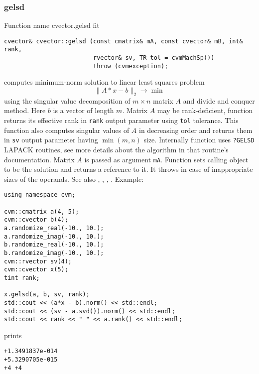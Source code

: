 \subsubsection{gelsd}
Function%
\pdfdest name {cvector.gelsd} fit
\begin{verbatim}
cvector& cvector::gelsd (const cmatrix& mA, const cvector& mB, int& rank,
                         rvector& sv, TR tol = cvmMachSp())
                         throw (cvmexception);
\end{verbatim}
computes  minimum-norm solution to  linear
least squares problem 
\begin{equation*}
\|A*x-b\|_2\to\min
\end{equation*}
using the singular value decomposition of $m\times n$ matrix $A$
and  divide and conquer method.
Here $b$ is a vector of length $m$.
Matrix $A$ may be rank-deficient, function returns its effective rank in \verb"rank"
output parameter using \verb"tol" tolerance.
This function also computes
singular values of $A$ in decreasing order and returns them in \verb"sv" output parameter
having $\min(m,n)$ size.
Internally  function uses \verb"?GELSD" LAPACK routines, see more details
about the algorithm in that routine's documentation.
Matrix $A$ is passed as  argument \verb"mA".
Function sets calling object to be the solution and returns a reference to it.
It throws
in case of inappropriate sizes of the operands.
See also , 
, , 
.
Example:
\begin{Verbatim}
using namespace cvm;

cvm::cmatrix a(4, 5);
cvm::cvector b(4);
a.randomize_real(-10., 10.);
a.randomize_imag(-10., 10.);
b.randomize_real(-10., 10.);
b.randomize_imag(-10., 10.);
cvm::rvector sv(4);
cvm::cvector x(5);
tint rank;

x.gelsd(a, b, sv, rank);
std::cout << (a*x - b).norm() << std::endl;
std::cout << (sv - a.svd()).norm() << std::endl;
std::cout << rank << " " << a.rank() << std::endl;
\end{Verbatim}
prints
\begin{Verbatim}
+1.3491837e-014
+5.3290705e-015
+4 +4
\end{Verbatim}
\newpage





